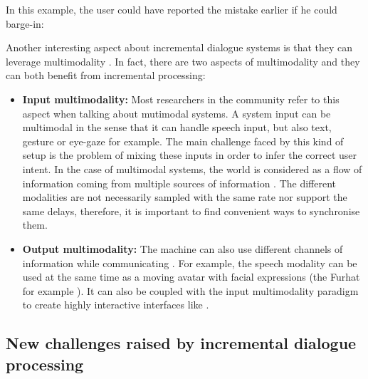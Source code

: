 								In this example, the user could have reported the mistake earlier if he could barge-in:
								
								\begin{dialogue}
								\end{dialogue}
								
		Another interesting aspect about incremental dialogue systems is that they can leverage multimodality \cite{Fink1998}. In fact, there are two aspects of multimodality and they can both benefit from incremental processing:
								
		\begin{itemize}
		   \item \textbf{Input multimodality:} Most researchers in the community refer to this aspect when talking about mutimodal systems. A system input can be multimodal in the sense that it can handle speech input, but also text, gesture or eye-gaze for example. The main challenge faced by this kind of setup is the problem of mixing these inputs in order to infer the correct user intent. In the case of multimodal systems, the world is considered as a flow of information coming from multiple sources of information \cite{Chao2012,Rosenthal2013}. The different modalities are not necessarily sampled with the same rate nor support the same delays, therefore, it is important to find convenient ways to synchronise them.
		   \item \textbf{Output multimodality:} The machine can also use different channels of information while communicating \cite{Matthias2009}. For example, the speech modality can be used at the same time as a moving avatar with facial expressions (the Furhat for example \cite{Skantze2015}). It can also be coupled with the input multimodality paradigm to create highly interactive interfaces like \cite{Johnston2014}.
		\end{itemize}
		

	\subsection{New challenges raised by incremental dialogue processing}
	\label{soa:challengesincr}
    

